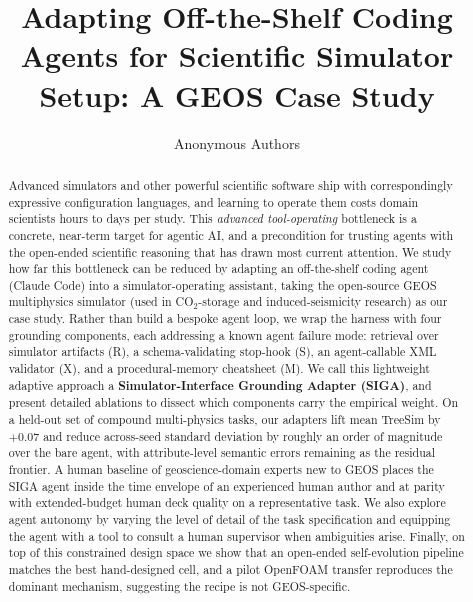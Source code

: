 \documentclass{article}
\title{Adapting Off-the-Shelf Coding Agents for Scientific Simulator Setup: A GEOS Case Study}
\author{%
  Anonymous Authors\\
}
\begin{document}
\maketitle


\begin{abstract}
Advanced simulators and other powerful scientific software ship with correspondingly expressive configuration languages, and learning to operate them costs domain scientists hours to days per study. This \emph{advanced tool-operating} bottleneck is a concrete, near-term target for agentic AI, and a precondition for trusting agents with the open-ended scientific reasoning that has drawn most current attention. We study how far this bottleneck can be reduced by adapting an off-the-shelf coding agent (Claude Code) into a simulator-operating assistant, taking the open-source GEOS multiphysics simulator (used in CO$_2$-storage and induced-seismicity research) as our case study. Rather than build a bespoke agent loop, we wrap the harness with four grounding components, each addressing a known agent failure mode: retrieval over simulator artifacts (R), a schema-validating stop-hook (S), an agent-callable XML validator (X), and a procedural-memory cheatsheet (M). We call this lightweight adaptive approach a \textbf{Simulator-Interface Grounding Adapter (SIGA)}, and present detailed ablations to dissect which components carry the empirical weight. On a held-out set of compound multi-physics tasks, our adapters lift mean TreeSim by $+0.07$ and reduce across-seed standard deviation by roughly an order of magnitude over the bare agent, with attribute-level semantic errors remaining as the residual frontier. A human baseline of geoscience-domain experts new to GEOS places the SIGA agent inside the time envelope of an experienced human author and at parity with extended-budget human deck quality on a representative task. We also explore agent autonomy by varying the level of detail of the task specification and equipping the agent with a tool to consult a human supervisor when ambiguities arise. Finally, on top of this constrained design space we show that an open-ended self-evolution pipeline matches the best hand-designed cell, and a pilot OpenFOAM transfer reproduces the dominant mechanism, suggesting the recipe is not GEOS-specific.
\end{abstract}
\end{document}
